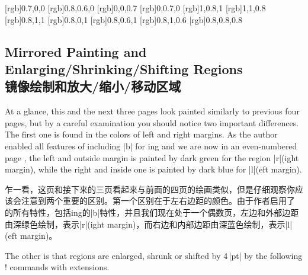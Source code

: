 \newpage
{}[rgb]{0.7,0,0}
[rgb]{0.8,0.6,0}
[rgb]{0,0,0.7}
[rgb]{0,0.7,0}
[rgb]{1,0.8,1}
[rgb]{1,1,0.8}
[rgb]{0.8,1,1}
[rgb]{0.8,0,1}
[rgb]{0.8,0.6,1}
[rgb]{0.8,1,0.6}
[rgb]{0.8,0.8,0.8}

\subsection{Mirrored Painting and Enlarging/Shrinking/Shifting Regions\\ 镜像绘制和放大/缩小/移动区域}
\label{sec:bgpaint-me}
\twosided

At a glance, this and the next three pages look painted similarly to
previous four pages, but by a careful examination you should notice
two important differences.  The first one is found in the colors
of left and right margins.  As the author enabled all features of
\Uidx{\!\twosided!} including |b| for \mirror{}ing and we are now in an
even-numbered page \pageref{sec:bgpaint-me}, the left and outside margin
is painted by dark green for the region |r|(ight margin), while the right
and inside one is painted by dark blue for |l|(eft margin).

乍一看，这页和接下来的三页看起来与前面的四页的绘画类似，但是仔细观察你应该会注意到两个重要的区别。第一个区别在于左右边距的颜色。由于作者启用了 \Uidx{\!\twosided!} 的所有特性，包括\mirror{}ing的|b|特性，并且我们现在处于一个偶数页\pageref{sec:bgpaint-me}，左边和外部边距由深绿色绘制，表示|r|(ight margin)，而右边和内部边距由深蓝色绘制，表示|l|(eft margin)。

The other is that regions are enlarged, shrunk or shifted by 4\,|pt| by
the following \!\backgroundcolor! commands with extensions.

